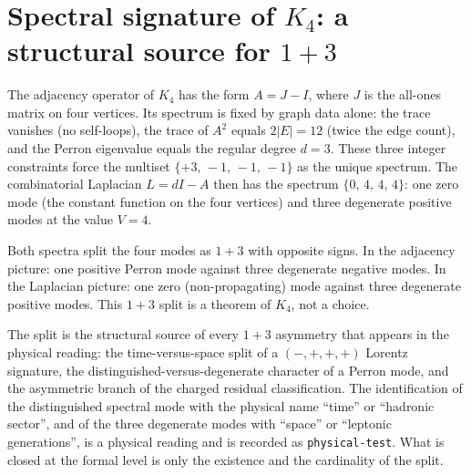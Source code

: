 \documentclass[11pt]{article}
\begin{document}
\begin{code}
\>[30]\AgdaSymbol{=}\AgdaSpace{}%
\<%
\\
%
\>[2]\AgdaSymbol{;}\AgdaSpace{}%
%
\>[30]\AgdaSymbol{=}\AgdaSpace{}%
\<%
\\
%
\>[2]\AgdaSymbol{;}\AgdaSpace{}%
%
\>[30]\AgdaSymbol{=}\AgdaSpace{}%
\<%
\\
%
\>[2]\AgdaSymbol{;}\AgdaSpace{}%
%
\>[30]\AgdaSymbol{=}\AgdaSpace{}%
\<%
\\
%
\>[2]\AgdaSymbol{;}\AgdaSpace{}%
\AgdaSpace{}%
\AgdaSymbol{=}\AgdaSpace{}%
\<%
\\
%
\>[2]\AgdaSymbol{\}}\<%
\end{code}

\section{Spectral signature of \texorpdfstring{$K_4$}{K4}: a structural source for $1+3$}

The adjacency operator of $K_4$ has the form $A = J - I$, where $J$ is
the all-ones matrix on four vertices.  Its spectrum is fixed by graph
data alone: the trace vanishes (no self-loops), the trace of $A^2$
equals $2|E| = 12$ (twice the edge count), and the Perron eigenvalue
equals the regular degree $d=3$.  These three integer constraints
force the multiset $\{+3,\,-1,\,-1,\,-1\}$ as the unique spectrum.
The combinatorial Laplacian $L = dI - A$ then has the spectrum
$\{0,\,4,\,4,\,4\}$: one zero mode (the constant function on the four
vertices) and three degenerate positive modes at the value $V=4$.

Both spectra split the four modes as $1+3$ with opposite signs.  In
the adjacency picture: one positive Perron mode against three
degenerate negative modes.  In the Laplacian picture: one zero
(non-propagating) mode against three degenerate positive modes.  This
$1+3$ split is a theorem of $K_4$, not a choice.

The split is the structural source of every $1+3$ asymmetry that
appears in the physical reading: the time-versus-space split of a
$(-,+,+,+)$ Lorentz signature, the distinguished-versus-degenerate
character of a Perron mode, and the asymmetric branch of the charged
residual classification.  The identification of the distinguished
spectral mode with the physical name ``time'' or ``hadronic sector'',
and of the three degenerate modes with ``space'' or ``leptonic
generations'', is a physical reading and is recorded as
\texttt{physical-test}.  What is closed at the formal level is only
the existence and the cardinality of the split.
\end{document}
